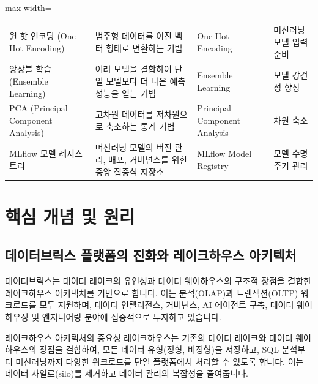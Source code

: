 \documentclass[11pt,a4paper]{article}
\begin{document}
\begin{adjustbox}{max width=\textwidth}
\begin{tabular}{llll}
원-핫 인코딩 (One-Hot Encoding) & 범주형 데이터를 이진 벡터 형태로 변환하는 기법 & One-Hot Encoding & 머신러닝 모델 입력 준비 \\
앙상블 학습 (Ensemble Learning) & 여러 모델을 결합하여 단일 모델보다 더 나은 예측 성능을 얻는 기법 & Ensemble Learning & 모델 강건성 향상 \\
PCA (Principal Component Analysis) & 고차원 데이터를 저차원으로 축소하는 통계 기법 & Principal Component Analysis & 차원 축소 \\
MLflow 모델 레지스트리 & 머신러닝 모델의 버전 관리, 배포, 거버넌스를 위한 중앙 집중식 저장소 & MLflow Model Registry & 모델 수명 주기 관리 \\
\bottomrule
\end{tabular}
\end{adjustbox}

\newpage
\section*{핵심 개념 및 원리}

\subsection{데이터브릭스 플랫폼의 진화와 레이크하우스 아키텍처}

데이터브릭스는 데이터 레이크의 유연성과 데이터 웨어하우스의 구조적 장점을 결합한 레이크하우스 아키텍처를 기반으로 합니다. 이는 분석(OLAP)과 트랜잭션(OLTP) 워크로드를 모두 지원하며, 데이터 인텔리전스, 거버넌스, AI 에이전트 구축, 데이터 웨어하우징 및 엔지니어링 분야에 집중적으로 투자하고 있습니다.

\begin{summarybox}{레이크하우스 아키텍처의 중요성}
레이크하우스는 기존의 데이터 레이크와 데이터 웨어하우스의 장점을 결합하여, 모든 데이터 유형(정형, 비정형)을 저장하고, SQL 분석부터 머신러닝까지 다양한 워크로드를 단일 플랫폼에서 처리할 수 있도록 합니다. 이는 데이터 사일로(silo)를 제거하고 데이터 관리의 복잡성을 줄여줍니다.
\end{summarybox}
\end{document}
